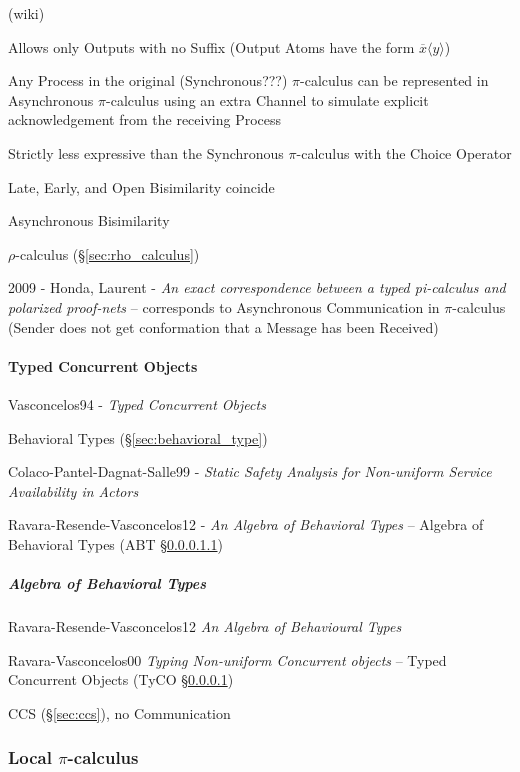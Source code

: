 (wiki)

Allows only Outputs with no Suffix (Output Atoms have the form
$\overline{x}\langle y \rangle$)

Any Process in the original (Synchronous???) $\pi$-calculus can be
represented in Asynchronous $\pi$-calculus using an extra Channel to
simulate explicit acknowledgement from the receiving Process

Strictly less expressive than the Synchronous $\pi$-calculus with the
Choice Operator

Late, Early, and Open Bisimilarity coincide %

Asynchronous Bisimilarity

$\rho$-calculus (\S\ref{sec:rho_calculus})

\asterism

2009 - Honda, Laurent - \emph{An exact correspondence between a typed
  pi-calculus and polarized proof-nets} -- corresponds to Asynchronous
Communication in $\pi$-calculus (Sender does not get conformation that a
Message has been Received)



\paragraph{Typed Concurrent Objects}\label{sec:tyco}\hfill

Vasconcelos94 - \emph{Typed Concurrent Objects}

\fist Behavioral Types (\S\ref{sec:behavioral_type})

Colaco-Pantel-Dagnat-Salle99 - \emph{Static Safety Analysis for
  Non-uniform Service Availability in Actors}

Ravara-Resende-Vasconcelos12 - \emph{An Algebra of Behavioral Types} --
\fist Algebra of Behavioral Types (ABT \S\ref{sec:abt})



\subparagraph{Algebra of Behavioral Types}\label{sec:abt}\hfill

Ravara-Resende-Vasconcelos12 \emph{An Algebra of Behavioural Types}

Ravara-Vasconcelos00 \emph{Typing Non-uniform Concurrent objects} --
Typed Concurrent Objects (TyCO \S\ref{sec:tyco})

CCS (\S\ref{sec:ccs}), no Communication



\subsubsection{Local $\pi$-calculus}\label{sec:local_pi_calculus}

